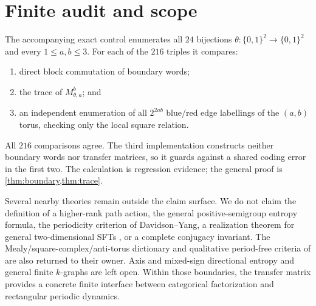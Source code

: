 \documentclass[11pt,a4paper]{amsart}
\theoremstyle{definition}
\theoremstyle{remark}
\begin{document}
\section{Finite audit and scope}

The accompanying exact control enumerates all $24$ bijections
$\theta:\{0,1\}^2\to\{0,1\}^2$ and every $1\leq a,b\leq3$.  For each of the
$216$ triples it compares:
\begin{enumerate}
\item direct block commutation of boundary words;
\item the trace of $M_{\theta,a}^b$; and
\item an independent enumeration of all $2^{2ab}$ blue/red edge labellings of
the $(a,b)$ torus, checking only the local square relation.
\end{enumerate}
All $216$ comparisons agree.  The third implementation constructs neither
boundary words nor transfer matrices, so it guards against a shared coding
error in the first two.  The calculation is regression evidence; the general
proof is \cref{thm:boundary,thm:trace}.

Several nearby theories remain outside the claim surface.  We do not claim
the definition of a higher-rank path action, the general positive-semigroup
entropy formula, the periodicity criterion of Davidson--Yang, a realization
theorem for general two-dimensional SFTs \cite{PaskRaeburnWeaver2009}, or a
complete conjugacy invariant.  The Mealy/square-complex/anti-torus dictionary
and qualitative period-free criteria of \citet{Pask2026} are also returned to
their owner.  Axis and mixed-sign directional entropy and general finite
$k$-graphs are left open.  Within those boundaries, the transfer matrix
provides a concrete finite interface between categorical factorization and
rectangular periodic dynamics.



\end{document}
